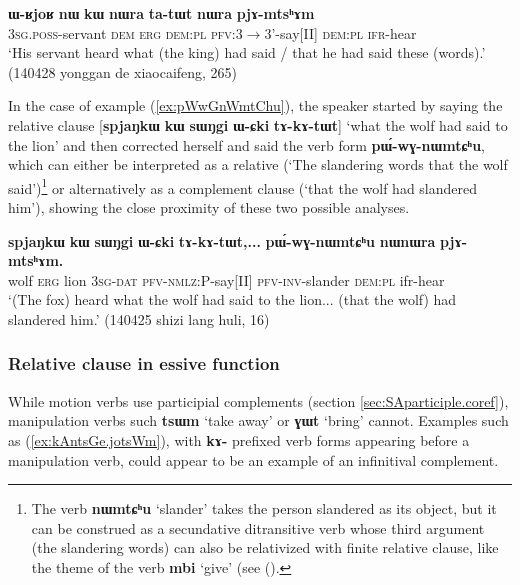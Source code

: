 \documentclass[oneside,a4paper,11pt]{article}
\newcommand{\ipa}[1]{\textbf{\phon#1}} %
\newcommand{\jpg}[2]{\ipa{#1} `#2'} %
\begin{document}
\begin{exe}
\ex \label{ex:tatWt.nWra}
\gll \ipa{ɯ-ʁjoʁ} 	\ipa{nɯ} 	\ipa{kɯ} 	\ipa{nɯra} 	\ipa{ta-tɯt} 	\ipa{nɯra} 	\ipa{pjɤ-mtsʰɤm} \\
\textsc{3sg.poss}-servant \textsc{dem} \textsc{erg} \textsc{dem:pl} \textsc{pfv}:3$\rightarrow$3'-say[II] \textsc{dem:pl}  \textsc{ifr}-hear \\
\glt `His servant heard what (the king) had said / that he had said these (words).' (140428 yonggan de xiaocaifeng, 265)
\end{exe}

In the case of example (\ref{ex:pWwGnWmtChu}), the speaker started by saying the relative clause [\ipa{spjaŋkɯ} \ipa{kɯ} \ipa{sɯŋgi} \ipa{ɯ-ɕki} \ipa{tɤ-kɤ-tɯt}] `what the wolf had said to the lion' and then corrected herself and said the verb form \ipa{pɯ́-wɣ-nɯmtɕʰu}, which can either be interpreted as a relative (`The slandering words that the wolf said')\footnote{The verb \jpg{nɯmtɕʰu}{slander} takes the person slandered as its object, but it can be construed as a secundative ditransitive verb whose third argument (the slandering words) can also be relativized with finite relative clause, like the theme of the verb \jpg{mbi}{give} (see (\citealt[16-17]{jacques16relatives}).} or alternatively as a complement clause (`that the wolf had slandered him'), showing the close proximity of these two possible analyses.

\begin{exe}
\ex \label{ex:pWwGnWmtChu}
\gll 
\ipa{spjaŋkɯ} 	\ipa{kɯ} 	\ipa{sɯŋgi} 	\ipa{ɯ-ɕki} 	\ipa{tɤ-kɤ-tɯt,...} 	\ipa{pɯ́-wɣ-nɯmtɕʰu} 	\ipa{nɯnɯra} 	\ipa{pjɤ-mtsʰɤm.} \\
wolf \textsc{erg} lion \textsc{3sg-dat} \textsc{pfv-nmlz:P}-say[II] \textsc{pfv-inv}-slander \textsc{dem:pl} ifr-hear \\
\glt `(The fox) heard what the wolf had said to the lion... (that the wolf) had slandered him.' (140425 shizi lang huli, 16)
\end{exe}

\subsubsection{Relative clause in essive function} \label{sec:essive}
While motion verbs use participial complements (section \ref{sec:SAparticiple.coref}), manipulation verbs such \jpg{tsɯm}{take away} or \jpg{ɣɯt}{bring} cannot. Examples such as (\ref{ex:kAntsGe.jotsWm}), with \ipa{kɤ-} prefixed verb forms appearing before a manipulation verb, could appear to be an example of an infinitival complement.
\end{document}
